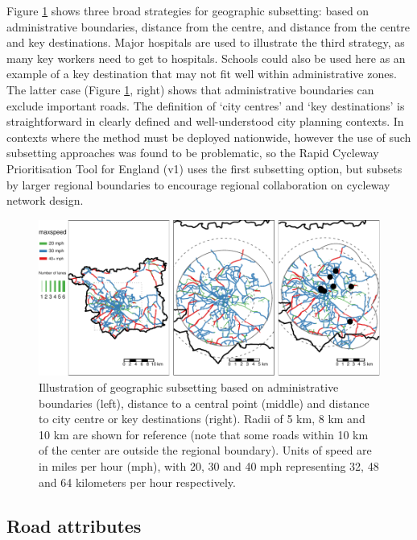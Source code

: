 \documentclass[
]{article}
\begin{document}
Figure \ref{fig:gsub} shows three broad strategies for geographic subsetting: based on administrative boundaries, distance from the centre, and distance from the centre and key destinations.
Major hospitals are used to illustrate the third strategy, as many key workers need to get to hospitals.
Schools could also be used here as an example of a key destination that may not fit well within administrative zones.
The latter case (Figure \ref{fig:gsub}, right) shows that administrative boundaries can exclude important roads.
The definition of `city centres' and `key destinations' is straightforward in clearly defined and well-understood city planning contexts.
In contexts where the method must be deployed nationwide, however the use of such subsetting approaches was found to be problematic, so the Rapid Cycleway Prioritisation Tool for England (v1) uses the first subsetting option, but subsets by larger regional boundaries to encourage regional collaboration on cycleway network design.

\begin{figure}
\includegraphics[width=1\linewidth]{article_files/figure-latex/gsub-1} \caption{Illustration of geographic subsetting based on administrative boundaries (left), distance to a central point (middle) and distance to city centre or key destinations (right). Radii of 5 km, 8 km and 10 km are shown for reference (note that some roads within 10 km of the center are outside the regional boundary). Units of speed are in miles per hour (mph), with 20, 30 and 40 mph representing 32, 48 and 64 kilometers per hour respectively.}\label{fig:gsub}
\end{figure}

\hypertarget{road-attributes}{%
\subsection{Road attributes}\label{road-attributes}}
\end{document}

